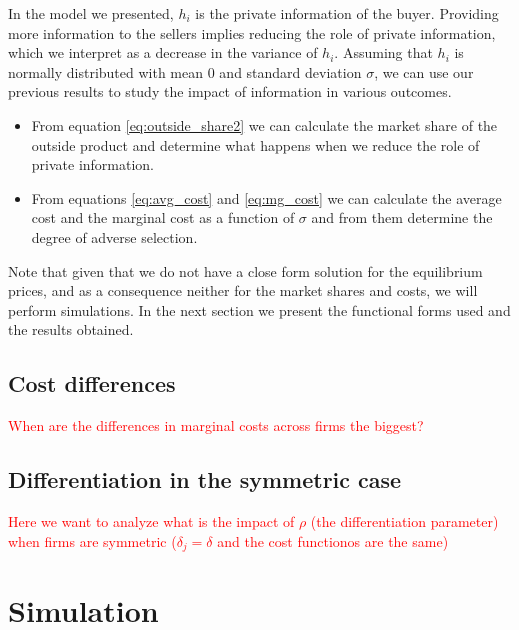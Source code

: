\documentclass[12pt]{article}
\theoremstyle{plain}
\theoremstyle{plain}
\begin{document}
In the model we presented, $h_i$ is the private information of the buyer. Providing more information to the sellers implies reducing the role of private information, which we interpret as a decrease in the variance of $h_i$. Assuming that $h_i$ is normally distributed with mean $0$ and standard deviation $\sigma$, we can use our previous results to study the impact of information in various outcomes.

\begin{itemize}
    \item From equation \ref{eq:outside_share2} we can calculate the market share of the outside product and determine what happens when we reduce the role of private information. 

    \item From equations \ref{eq:avg_cost} and \ref{eq:mg_cost} we can calculate the average cost and the marginal cost as a function of $\sigma$ and from them determine the degree of adverse selection. 

\end{itemize}


Note that given that we do not have a close form solution for the equilibrium prices, and as a consequence neither for the market shares and costs, we will perform simulations. In the next section we present the functional forms used and the results obtained. 

\newpage

\subsection{Cost differences}

\textcolor{red}{When are the differences in marginal costs across firms the biggest? }

\subsection{Differentiation in the symmetric case}

\textcolor{red}{Here we want to analyze what is the impact of $\rho$ (the differentiation parameter) when firms are symmetric ($\delta_j = \delta$ and the cost functionos are the same) }



\section{Simulation}\label{sec:simulation}
\end{document}
